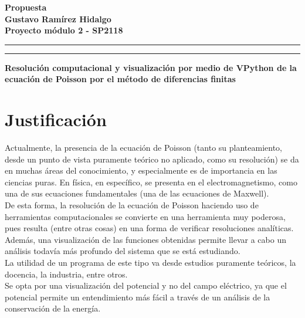 \documentclass[letter]{article}
\newcommand{\entitle}[1]{
  \vspace{0.3cm}%
  \noindent%
  \textbf{#1}%
  \vspace{0.2cm}%
  \hrule\vspace*{0.5mm}%
  \noindent%
  \rule{\linewidth}{0.5mm}%
  \vspace{0.5cm}%
}%
\begin{document}

\newcommand{\uic}{blue} %
\newcommand{\uim}{\_\_} %
\newcommand{\userinput}[1]{\textcolor{\uic}{\uim#1\uim}}












\begin{center}
\entitle{Propuesta \\ Gustavo Ramírez Hidalgo \\ Proyecto módulo 2 - SP2118}
\end{center}

\begin{center}
\textbf{Resolución computacional y visualización por medio de VPython de la ecuación de Poisson por el método de diferencias finitas}
\end{center}


\section{\normalsize Justificación}
Actualmente, la presencia de la ecuación de Poisson (tanto su planteamiento, desde un punto de vista puramente teórico no aplicado, como su resolución) se da en muchas áreas del conocimiento, y especialmente es de importancia en las ciencias puras. En física, en específico, se presenta en el electromagnetismo, como una de sus ecuaciones fundamentales (una de las ecuaciones de Maxwell).\\
De esta forma, la resolución de la ecuación de Poisson haciendo uso de herramientas computacionales se convierte en una herramienta muy poderosa, pues resulta (entre otras cosas) en una forma de verificar resoluciones analíticas. Además, una visualización de las funciones obtenidas permite llevar a cabo un análisis todavía más profundo del sistema que se está estudiando.\\
La utilidad de un programa de este tipo va desde estudios puramente teóricos, la docencia, la industria, entre otros.\\
Se opta por una visualización del potencial y no del campo eléctrico, ya que el potencial permite un entendimiento más fácil a través de un análisis de la conservación de la energía.
\end{document}
